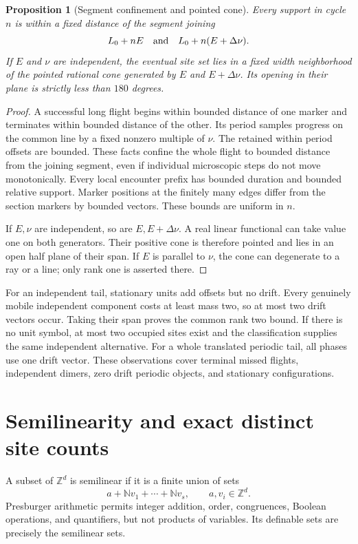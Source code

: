 \documentclass[11pt,letterpaper]{article}
\numberwithin{equation}{section}
\newtheorem{proposition}[theorem]{Proposition}
\theoremstyle{definition}
\theoremstyle{remark}
\newcommand{\Z}{\mathbb Z}
\newcommand{\NN}{\mathbb N}
\begin{document}
\begin{proposition}[Segment confinement and pointed cone]\label{smc:og:prop:cone}
Every support in cycle $n$ is within a fixed distance of the segment joining
\[
 L_0+nE\quad\hbox{and}\quad L_0+n(E+\Delta\nu).
\]
If $E$ and $\nu$ are independent, the eventual site set lies in a fixed width neighborhood of the pointed rational cone generated by $E$ and $E+\Delta\nu$. Its opening in their plane is strictly less than $180$ degrees.
\end{proposition}
\begin{proof}
A successful long flight begins within bounded distance of one marker and terminates within bounded distance of the other. Its period samples progress on the common line by a fixed nonzero multiple of $\nu$. The retained within period offsets are bounded. These facts confine the whole flight to bounded distance from the joining segment, even if individual microscopic steps do not move monotonically. Every local encounter prefix has bounded duration and bounded relative support. Marker positions at the finitely many edges differ from the section markers by bounded vectors. These bounds are uniform in $n$.

If $E,\nu$ are independent, so are $E,E+\Delta\nu$. A real linear functional can take value one on both generators. Their positive cone is therefore pointed and lies in an open half plane of their span. If $E$ is parallel to $\nu$, the cone can degenerate to a ray or a line; only rank one is asserted there.
\end{proof}

For an independent tail, stationary units add offsets but no drift. Every genuinely mobile independent component costs at least mass two, so at most two drift vectors occur. Taking their span proves the common rank two bound. If there is no unit symbol, at most two occupied sites exist and the classification supplies the same independent alternative. For a whole translated periodic tail, all phases use one drift vector. These observations cover terminal missed flights, independent dimers, zero drift periodic objects, and stationary configurations.

\section{Semilinearity and exact distinct site counts}\label{smc:og:sec:count}
A subset of $\Z^d$ is semilinear if it is a finite union of sets
\[
 a+\NN v_1+\cdots+\NN v_s,
 \qquad a,v_i\in\Z^d.
\]
Presburger arithmetic permits integer addition, order, congruences, Boolean operations, and quantifiers, but not products of variables. Its definable sets are precisely the semilinear sets.
\end{document}
